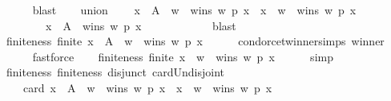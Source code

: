 \begin{isabellebody}
\ \ \ \ \isamarkupfalse%
\ blast\isanewline
\ \ \isamarkupfalse%
\ union{\isacharcolon}{\kern0pt}\isanewline
\ \ \ \ {\isachardoublequoteopen}{\isacharbraceleft}{\kern0pt}x\ {\isasymin}\ A\ {\isacharminus}{\kern0pt}\ {\isacharbraceleft}{\kern0pt}w{\isacharbraceright}{\kern0pt}\ {\isachardot}{\kern0pt}\ wins\ w\ p\ x{\isacharbraceright}{\kern0pt}\ {\isasymunion}\ {\isacharbraceleft}{\kern0pt}x\ {\isasymin}\ {\isacharbraceleft}{\kern0pt}w{\isacharbraceright}{\kern0pt}\ {\isachardot}{\kern0pt}\ wins\ w\ p\ x{\isacharbraceright}{\kern0pt}\ {\isacharequal}{\kern0pt}\isanewline
\ \ \ \ \ \ \ \ {\isacharbraceleft}{\kern0pt}x\ {\isasymin}\ A\ {\isachardot}{\kern0pt}\ wins\ w\ p\ x{\isacharbraceright}{\kern0pt}{\isachardoublequoteclose}\isanewline
\ \ \ \ \isamarkupfalse%
\ {\isachardoublequoteopen}{}{\isachardoublequoteclose}\isanewline
\ \ \ \ \isamarkupfalse%
\ blast\isanewline
\ \ \isamarkupfalse%
\ finiteness{}{\isacharcolon}{\kern0pt}\ {\isachardoublequoteopen}finite\ {\isacharbraceleft}{\kern0pt}x\ {\isasymin}\ A\ {\isacharminus}{\kern0pt}\ {\isacharbraceleft}{\kern0pt}w{\isacharbraceright}{\kern0pt}\ {\isachardot}{\kern0pt}\ wins\ w\ p\ x{\isacharbraceright}{\kern0pt}{\isachardoublequoteclose}\isanewline
\ \ \ \ \isamarkupfalse%
\ condorcet{\isacharunderscore}{\kern0pt}winner{\isachardot}{\kern0pt}simps\ winner\isanewline
\ \ \ \ \isamarkupfalse%
\ fastforce\isanewline
\ \ \isamarkupfalse%
\ finiteness{}{\isacharcolon}{\kern0pt}\ {\isachardoublequoteopen}finite\ {\isacharbraceleft}{\kern0pt}x\ {\isasymin}\ {\isacharbraceleft}{\kern0pt}w{\isacharbraceright}{\kern0pt}\ {\isachardot}{\kern0pt}\ wins\ w\ p\ x{\isacharbraceright}{\kern0pt}{\isachardoublequoteclose}\isanewline
\ \ \ \ \isamarkupfalse%
\ simp\isanewline
\ \ \isamarkupfalse%
\ finiteness{}\ finiteness{}\ disjunct\ card{\isacharunderscore}{\kern0pt}Un{\isacharunderscore}{\kern0pt}disjoint\isanewline
\ \ \isamarkupfalse%
\isanewline
\ \ \ \ {\isachardoublequoteopen}card\ {\isacharparenleft}{\kern0pt}{\isacharbraceleft}{\kern0pt}x\ {\isasymin}\ A\ {\isacharminus}{\kern0pt}\ {\isacharbraceleft}{\kern0pt}w{\isacharbraceright}{\kern0pt}\ {\isachardot}{\kern0pt}\ wins\ w\ p\ x{\isacharbraceright}{\kern0pt}\ {\isasymunion}\ {\isacharbraceleft}{\kern0pt}x\ {\isasymin}\ {\isacharbraceleft}{\kern0pt}w{\isacharbraceright}{\kern0pt}\ {\isachardot}{\kern0pt}\ wins\ w\ p\ x{\isacharbraceright}{\kern0pt}{\isacharparenright}{\kern0pt}\ {\isacharequal}{\kern0pt}\isanewline

\end{isabellebody}
